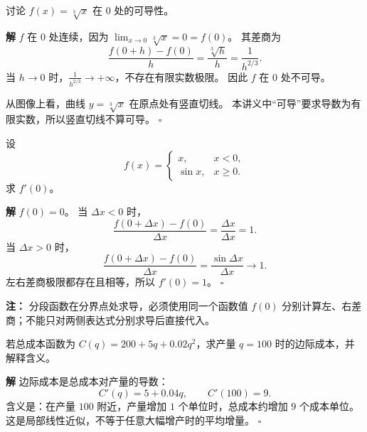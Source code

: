 \documentclass[fontset=fandol]{ctexart}
\newenvironment{solution}{\par\noindent\textbf{解}\quad}{\hfill$\square$\par\vspace{0.8em}}
\newenvironment{warning}{\par\noindent\textbf{注：}\quad}{\par\vspace{0.8em}}
\begin{document}
\begin{example}[竖切线与有限导数]
讨论 $f(x)=\sqrt[3]{x}$ 在 $0$ 处的可导性。
\end{example}
\begin{solution}
$f$ 在 $0$ 处连续，因为 $\lim_{x\to0}\sqrt[3]{x}=0=f(0)$。 其差商为
\[
\frac{f(0+h)-f(0)}{h}=\frac{\sqrt[3]{h}}{h}=\frac1{h^{2/3}}.
\]
当 $h\to0$ 时，$\frac1{h^{2/3}}\to+\infty$，不存在有限实数极限。 因此 $f$ 在 $0$ 处不可导。

从图像上看，曲线 $y=\sqrt[3]{x}$ 在原点处有竖直切线。 本讲义中“可导”要求导数为有限实数，所以竖直切线不算可导。
\end{solution}

\begin{example}[分段函数在衔接点的导数]
设
\[
f(x)=
\begin{cases}
x,&x<0,\\
\sin x,&x\geq0.
\end{cases}
\]
求 $f'(0)$。
\end{example}
\begin{solution}
$f(0)=0$。 当 $\Delta x<0$ 时，
\[
\frac{f(0+\Delta x)-f(0)}{\Delta x}=\frac{\Delta x}{\Delta x}=1.
\]
当 $\Delta x>0$ 时，
\[
\frac{f(0+\Delta x)-f(0)}{\Delta x}=\frac{\sin\Delta x}{\Delta x}\to1.
\]
左右差商极限都存在且相等，所以 $f'(0)=1$。
\end{solution}
\begin{warning}
分段函数在分界点处求导，必须使用同一个函数值 $f(0)$ 分别计算左、右差商；不能只对两侧表达式分别求导后直接代入。
\end{warning}

\begin{example}[边际成本]
若总成本函数为 $C(q)=200+5q+0.02q^2$，求产量 $q=100$ 时的边际成本，并解释含义。
\end{example}
\begin{solution}
边际成本是总成本对产量的导数：
\[
C'(q)=5+0.04q,\qquad C'(100)=9.
\]
含义是：在产量 $100$ 附近，产量增加 $1$ 个单位时，总成本约增加 $9$ 个成本单位。 这是局部线性近似，不等于任意大幅增产时的平均增量。
\end{solution}
\end{document}
